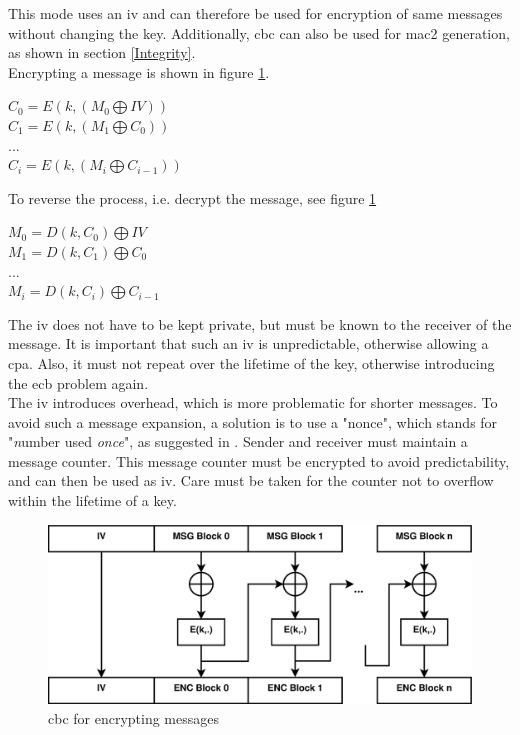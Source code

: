 This mode uses an \gls{iv} and can therefore be used for encryption of same messages without changing the key. Additionally, \gls{cbc} can also be used
for \gls{mac2} generation, as shown in section \ref{Integrity}.
\\
Encrypting a message is shown in figure \ref{fig:cbc_encrypt}.
\begin{center}
$ C_0 = E(k, (M_0 \bigoplus IV ) )  $
\\
$ C_1 = E(k, (M_1  \bigoplus C_0) ) $
\\
$...$
\\
$ C_i = E(k, (M_i \bigoplus C_{i-1} ) )  $
\end{center}
To reverse the process, i.e. decrypt the message, see figure \ref{fig:cbc_encrypt}
\begin{center}
$ M_0 = D(k, C_0) \bigoplus IV $
\\
$ M_1 = D(k, C_1) \bigoplus C_0 $
\\
$...$
\\
$ M_i = D(k, C_i) \bigoplus C_{i-1} $
\end{center}
The \gls{iv} does not have to be kept private, but must be known to the receiver of the message. It is important that such an \gls{iv} is unpredictable, otherwise
allowing a \gls{cpa}. Also, it must not repeat over the lifetime of the key, otherwise introducing the \gls{ecb} problem again. 
\\
The \gls{iv} introduces overhead, which is more problematic for  shorter messages.
To avoid such a message expansion, a solution is to use a "nonce", which stands for "\textit{n}umber used \textit{once}", as suggested in \cite{cryptoEng}.
Sender and receiver must maintain a message counter. This message counter must be encrypted to avoid predictability, and can then be used as \gls{iv}. Care must
be taken for the counter not to overflow within the lifetime of a key.

\begin{figure}
    \centering
    \includegraphics[width=1\textwidth]{figures/CBCencrypt.eps}
    \caption{\gls{cbc} for encrypting messages}
    \label{fig:cbc_encrypt}
\end{figure}

